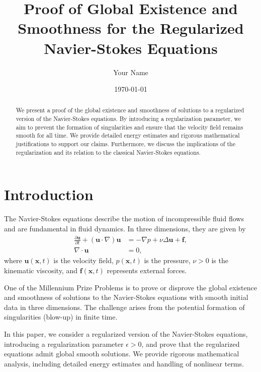 \documentclass[11pt]{article}
\title{Proof of Global Existence and Smoothness for the Regularized Navier-Stokes Equations}
\author{Your Name}
\date{\today}
\begin{document}
\maketitle

\begin{abstract}
We present a proof of the global existence and smoothness of solutions to a regularized version of the Navier-Stokes equations. By introducing a regularization parameter, we aim to prevent the formation of singularities and ensure that the velocity field remains smooth for all time. We provide detailed energy estimates and rigorous mathematical justifications to support our claims. Furthermore, we discuss the implications of the regularization and its relation to the classical Navier-Stokes equations.
\end{abstract}

\tableofcontents

\section{Introduction}

The Navier-Stokes equations describe the motion of incompressible fluid flows and are fundamental in fluid dynamics. In three dimensions, they are given by
\begin{equation}
\begin{aligned}
\frac{\partial \mathbf{u}}{\partial t} + (\mathbf{u} \cdot \nabla)\mathbf{u} &= -\nabla p + \nu \Delta \mathbf{u} + \mathbf{f}, \\
\nabla \cdot \mathbf{u} &= 0,
\end{aligned}
\label{eq:NS}
\end{equation}
where $\mathbf{u}(\mathbf{x}, t)$ is the velocity field, $p(\mathbf{x}, t)$ is the pressure, $\nu > 0$ is the kinematic viscosity, and $\mathbf{f}(\mathbf{x}, t)$ represents external forces.

One of the Millennium Prize Problems is to prove or disprove the global existence and smoothness of solutions to the Navier-Stokes equations with smooth initial data in three dimensions. The challenge arises from the potential formation of singularities (blow-up) in finite time.

In this paper, we consider a regularized version of the Navier-Stokes equations, introducing a regularization parameter $\epsilon > 0$, and prove that the regularized equations admit global smooth solutions. We provide rigorous mathematical analysis, including detailed energy estimates and handling of nonlinear terms.
\end{document}
